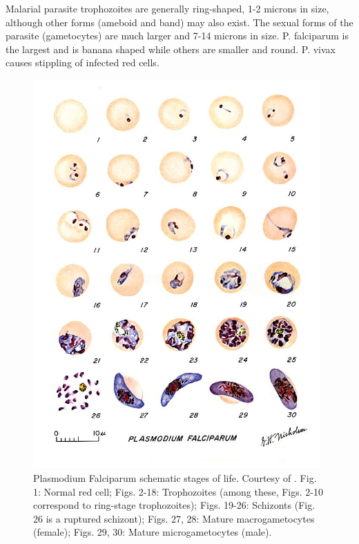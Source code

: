 \documentclass[final,a4paper,12pt,english]{UnicaPhdThesis3}
\begin{document}
{Malarial parasite trophozoites are generally ring-shaped, 1-2 microns in size, although other forms (ameboid and band) may also exist. The sexual forms of the parasite (gametocytes) are much larger and 7-14 microns in size. P. falciparum is the largest and is banana shaped while others are smaller and round. P. vivax causes stippling of infected red cells.
\begin{figure}[!htbp]
	\centering
	\includegraphics[width=0.98\textwidth]{images/malaria_th/mal_falc}
	\caption{\label{fig:falci_th} Plasmodium Falciparum schematic stages of life. Courtesy of \cite{Med_cdc}.
	Fig. 1: Normal red cell; Figs. 2-18: Trophozoites (among these, Figs. 2-10 correspond to ring-stage trophozoites); Figs. 19-26: Schizonts (Fig. 26 is a ruptured schizont); Figs. 27, 28: Mature macrogametocytes (female); Figs. 29, 30: Mature microgametocytes (male).}
\end{figure}

}
\end{document}
